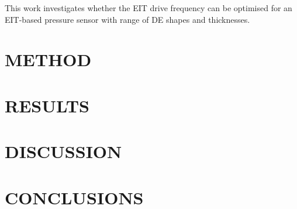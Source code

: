 
This work investigates whether the EIT drive frequency can be optimised for an EIT-based pressure sensor with range of DE shapes and thicknesses.


\section{METHOD}




\section{RESULTS}




\section{DISCUSSION}




\section{CONCLUSIONS}
